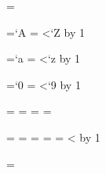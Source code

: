 \makeatletter
\ifdefined\XeTeXinterchartokenstate

    \newXeTeXintercharclass\mablatinletters
    \newXeTeXintercharclass\mablatincontinuation
    \newcount\mabinterchartop

    \ifdefined\e@alloc@intercharclass@top
        \mabinterchartop=\e@alloc@intercharclass@top
    \else
        \ifdefined\XeTeXinterwordspaceshaping
        \else
        \fi
    \fi

    \count@=`A
    \loop
        \XeTeXcharclass\count@=\mablatinletters
        \ifnum\count@<`Z
            \advance\count@ by 1
    \repeat

    \count@=`a
    \loop
        \XeTeXcharclass\count@=\mablatinletters
        \ifnum\count@<`z
            \advance\count@ by 1
    \repeat

    \count@=`0
    \loop
        \XeTeXcharclass\count@=\mablatincontinuation
        \ifnum\count@<`9
            \advance\count@ by 1
    \repeat

    =\mablatincontinuation  %
    =\mablatincontinuation  %
    =\mablatincontinuation  %
    =\mablatincontinuation  %

    \loop
        \ifnum\count@=\mablatinletters\else
            \ifnum\count@=\mablatincontinuation\else
                \XeTeXinterchartoks\count@ \mablatinletters={\itshape}
                \XeTeXinterchartoks\mablatinletters \count@={\upshape}
                \XeTeXinterchartoks\mablatincontinuation \count@={\upshape}
            \fi
        \fi
        \ifnum\count@<\mabinterchartop
            \advance\count@ by 1
    \repeat

    \XeTeXinterchartoks\mablatincontinuation \mablatinletters={\itshape}

    \expandafter\everypar\expandafter{\the\everypar\upshape}
\fi
\makeatother

